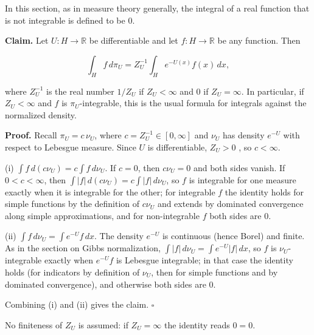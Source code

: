 \documentclass[11pt,a4paper]{article}
\begin{document}
In this section, as in measure theory generally, the integral of a real function that is not integrable is defined to be \(0\).




\textbf{Claim.} Let \(U:H\to\mathbb R\) be differentiable and let \(f:H\to\mathbb R\) be any function. Then


\[\int_Hf\,d\pi_U=Z_U^{-1}\int_He^{-U(x)}f(x)\,dx,\]


where \(Z_U^{-1}\) is the real number \(1/Z_U\) if \(Z_U<\infty\) and \(0\) if \(Z_U=\infty\). In particular, if \(Z_U<\infty\) and \(f\) is \(\pi_U\)-integrable, this is the usual formula for integrals against the normalized density.




\textbf{Proof.} Recall \(\pi_U=c\,\nu_U\), where \(c=Z_U^{-1}\in[0,\infty]\) and \(\nu_U\) has density \(e^{-U}\) with respect to Lebesgue measure. Since \(U\) is differentiable, \(Z_U>0\) \cite[Section~3.26.9]{LangevinLean2026ULASC}, so \(c<\infty\).




(i) \(\int f\,d(c\nu_U)=c\int f\,d\nu_U\). If \(c=0\), then \(c\nu_U=0\) and both sides vanish. If \(0<c<\infty\), then \(\int|f|\,d(c\nu_U)=c\int|f|\,d\nu_U\), so \(f\) is integrable for one measure exactly when it is integrable for the other; for integrable \(f\) the identity holds for simple functions by the definition of \(c\nu_U\) and extends by dominated convergence along simple approximations, and for non-integrable \(f\) both sides are \(0\).




(ii) \(\int f\,d\nu_U=\int e^{-U}f\,dx\). The density \(e^{-U}\) is continuous (hence Borel) and finite. As in the section on Gibbs normalization, \(\int|f|\,d\nu_U=\int e^{-U}|f|\,dx\), so \(f\) is \(\nu_U\)-integrable exactly when \(e^{-U}f\) is Lebesgue integrable; in that case the identity holds (for indicators by definition of \(\nu_U\), then for simple functions and by dominated convergence), and otherwise both sides are \(0\).




Combining (i) and (ii) gives the claim. \(\square\)




No finiteness of \(Z_U\) is assumed: if \(Z_U=\infty\) the identity reads \(0=0\).
\end{document}
